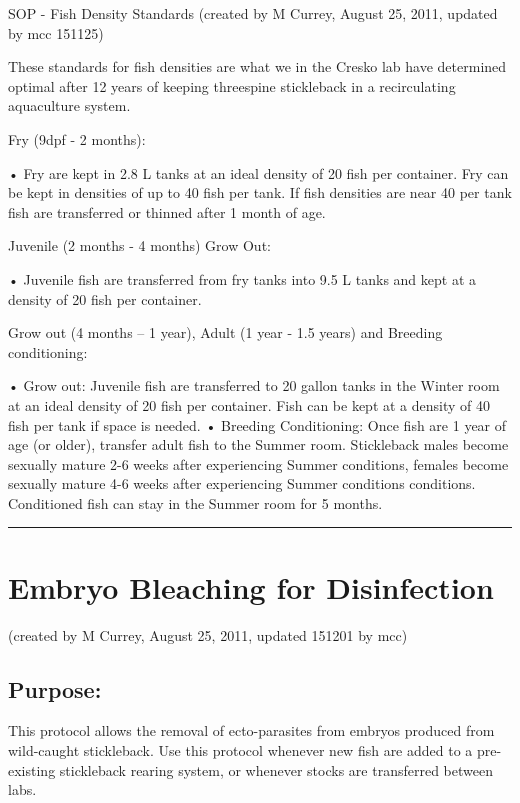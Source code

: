 \documentclass[
]{book}
\begin{document}
SOP - Fish Density Standards
(created by M Currey, August 25, 2011, updated by mcc 151125)

These standards for fish densities are what we in the Cresko lab have determined optimal after 12 years of keeping threespine stickleback in a recirculating aquaculture system.

Fry (9dpf - 2 months):

• Fry are kept in 2.8 L tanks at an ideal density of 20 fish per container. Fry can be kept in densities of up to 40 fish per tank. If fish densities are near 40 per tank fish are transferred or thinned after 1 month of age.

Juvenile (2 months - 4 months) Grow Out:

• Juvenile fish are transferred from fry tanks into 9.5 L tanks and kept at a density of 20 fish per container.

Grow out (4 months -- 1 year), Adult (1 year - 1.5 years) and Breeding conditioning:

• Grow out: Juvenile fish are transferred to 20 gallon tanks in the Winter room at an ideal density of 20 fish per container. Fish can be kept at a density of 40 fish per tank if space is needed.
• Breeding Conditioning: Once fish are 1 year of age (or older), transfer adult fish to the Summer room. Stickleback males become sexually mature 2-6 weeks after experiencing Summer conditions, females become sexually mature 4-6 weeks after experiencing Summer conditions conditions. Conditioned fish can stay in the Summer room for 5 months.

\begin{center}\rule{0.5\linewidth}{0.5pt}\end{center}

\hypertarget{embryo-bleaching-for-disinfection}{%
\section{Embryo Bleaching for Disinfection}\label{embryo-bleaching-for-disinfection}}

(created by M Currey, August 25, 2011, updated 151201 by mcc)

\hypertarget{purpose}{%
\subsection{Purpose:}\label{purpose}}

This protocol allows the removal of ecto-parasites from embryos produced from wild-caught stickleback. Use this protocol whenever new fish are added to a pre-existing stickleback rearing system, or whenever stocks are transferred between labs.
\end{document}
